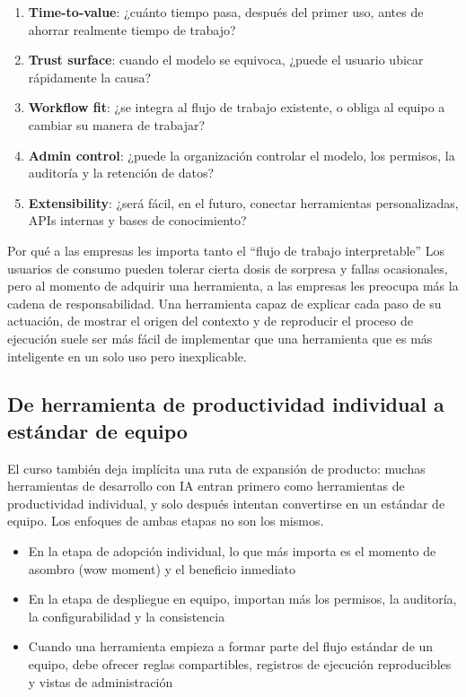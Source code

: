\begin{enumerate}
    \item \textbf{Time-to-value}: ¿cuánto tiempo pasa, después del primer uso, antes de ahorrar realmente tiempo de trabajo?
    \item \textbf{Trust surface}: cuando el modelo se equivoca, ¿puede el usuario ubicar rápidamente la causa?
    \item \textbf{Workflow fit}: ¿se integra al flujo de trabajo existente, o obliga al equipo a cambiar su manera de trabajar?
    \item \textbf{Admin control}: ¿puede la organización controlar el modelo, los permisos, la auditoría y la retención de datos?
    \item \textbf{Extensibility}: ¿será fácil, en el futuro, conectar herramientas personalizadas, APIs internas y bases de conocimiento?
\end{enumerate}

\begin{knowledgebox}{Por qué a las empresas les importa tanto el ``flujo de trabajo interpretable''}
Los usuarios de consumo pueden tolerar cierta dosis de sorpresa y fallas ocasionales, pero al momento de adquirir una herramienta, a las empresas les preocupa más la cadena de responsabilidad. Una herramienta capaz de explicar cada paso de su actuación, de mostrar el origen del contexto y de reproducir el proceso de ejecución suele ser más fácil de implementar que una herramienta que es más inteligente en un solo uso pero inexplicable.
\end{knowledgebox}

\subsection{De herramienta de productividad individual a estándar de equipo}

El curso también deja implícita una ruta de expansión de producto: muchas herramientas de desarrollo con IA entran primero como herramientas de productividad individual, y solo después intentan convertirse en un estándar de equipo. Los enfoques de ambas etapas no son los mismos.

\begin{itemize}
    \item En la etapa de adopción individual, lo que más importa es el momento de asombro (wow moment) y el beneficio inmediato
    \item En la etapa de despliegue en equipo, importan más los permisos, la auditoría, la configurabilidad y la consistencia
    \item Cuando una herramienta empieza a formar parte del flujo estándar de un equipo, debe ofrecer reglas compartibles, registros de ejecución reproducibles y vistas de administración
\end{itemize}

